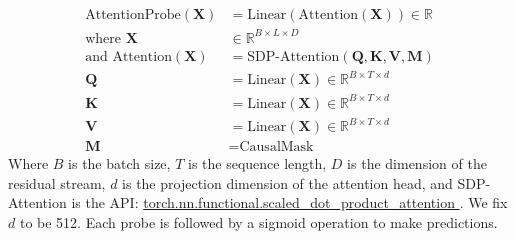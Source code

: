 \begin{align*}
\text{AttentionProbe}(\boldsymbol{X}) &= \text{Linear}(\text{Attention}(\boldsymbol{X})) \in \mathbb{R} \\
\text{where } \boldsymbol{X} &\in \mathbb{R}^{B \times L \times D} \\
\text{and } \text{Attention}(\boldsymbol{X}) &= \text{SDP-Attention}(\boldsymbol{Q}, \boldsymbol{K}, \boldsymbol{V}, \boldsymbol{M}) \\
\boldsymbol{Q} &= \text{Linear}(\boldsymbol{X}) \in \mathbb{R}^{B \times T \times d} \\
\boldsymbol{K} &= \text{Linear}(\boldsymbol{X}) \in \mathbb{R}^{B \times T \times d} \\
\boldsymbol{V} &= \text{Linear}(\boldsymbol{X}) \in \mathbb{R}^{B \times T \times d} \\
\boldsymbol{M} &= \text{CausalMask}
\end{align*}
Where $B$ is the batch size, $T$ is the sequence length, $D$ is the dimension of the residual stream, $d$ is the projection dimension of the attention head, and SDP-Attention is the API: \href{https://docs.pytorch.org/docs/stable/generated/torch.nn.functional.scaled_dot_product_attention.html}{torch.nn.functional.scaled\_dot\_product\_attention
}. We fix $d$ to be 512. Each probe is followed by a sigmoid operation to make predictions.


